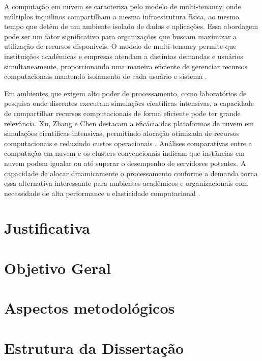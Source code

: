 A computação em nuvem se caracteriza pelo modelo de multi-tenancy, onde múltiplos inquilinos compartilham a mesma infraestrutura física, ao mesmo tempo que detêm de um ambiente isolado de dados e aplicações. Essa abordagem pode ser um fator significativo para organizações que buscam maximizar a utilização de recursos disponíveis. O modelo de multi-tenancy permite que instituições acadêmicas e empresas atendam a distintas demandas e usuários simultaneamente, proporcionando uma maneira eficiente de gerenciar recursos computacionais mantendo isolamento de cada usuário e sistema \cite{heuchert2021}.

Em ambientes que exigem alto poder de processamento, como laboratórios de pesquisa onde discentes executam simulações científicas intensivas, a capacidade de compartilhar recursos computacionais de forma eficiente pode ter grande relevância. Xu, Zhang e Chen destacam a eficácia das plataformas de nuvem em simulações científicas intensivas, permitindo alocação otimizada de recursos computacionais e reduzindo custos operacionais \cite{xu2021}. Análises comparativas entre a computação em nuvem e os clusters convencionais indicam que instâncias em nuvem podem igualar ou até superar o desempenho de servidores potentes. A capacidade de alocar dinamicamente o processamento conforme a demanda torna essa alternativa interessante para ambientes acadêmicos e organizacionais com necessidade de alta performance e elasticidade computacional \cite{roloff2012}. 

\section{Justificativa}

\section{Objetivo Geral}

\section{Aspectos metodológicos}

\section{Estrutura da Dissertação}

